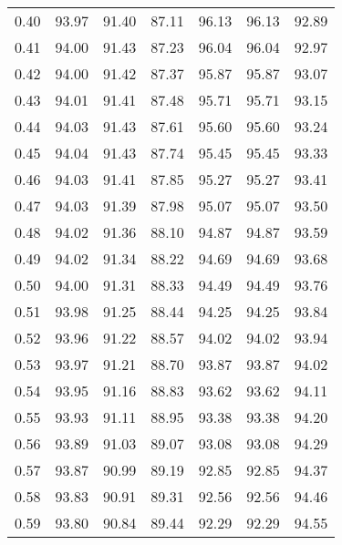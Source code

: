 \begin{tabular}{|c|c|c|c|c|c|c|}
      0.40 &     93.97 &     91.40 &      87.11 &   96.13 &      96.13 &         92.89 \\
      0.41 &     94.00 &     91.43 &      87.23 &   96.04 &      96.04 &         92.97 \\
      0.42 &     94.00 &     91.42 &      87.37 &   95.87 &      95.87 &         93.07 \\
      0.43 &     94.01 &     91.41 &      87.48 &   95.71 &      95.71 &         93.15 \\
      0.44 &     94.03 &     91.43 &      87.61 &   95.60 &      95.60 &         93.24 \\
      0.45 &     94.04 &     91.43 &      87.74 &   95.45 &      95.45 &         93.33 \\
      0.46 &     94.03 &     91.41 &      87.85 &   95.27 &      95.27 &         93.41 \\
      0.47 &     94.03 &     91.39 &      87.98 &   95.07 &      95.07 &         93.50 \\
      0.48 &     94.02 &     91.36 &      88.10 &   94.87 &      94.87 &         93.59 \\
      0.49 &     94.02 &     91.34 &      88.22 &   94.69 &      94.69 &         93.68 \\
      0.50 &     94.00 &     91.31 &      88.33 &   94.49 &      94.49 &         93.76 \\
      0.51 &     93.98 &     91.25 &      88.44 &   94.25 &      94.25 &         93.84 \\
      0.52 &     93.96 &     91.22 &      88.57 &   94.02 &      94.02 &         93.94 \\
      0.53 &     93.97 &     91.21 &      88.70 &   93.87 &      93.87 &         94.02 \\
      0.54 &     93.95 &     91.16 &      88.83 &   93.62 &      93.62 &         94.11 \\
      0.55 &     93.93 &     91.11 &      88.95 &   93.38 &      93.38 &         94.20 \\
      0.56 &     93.89 &     91.03 &      89.07 &   93.08 &      93.08 &         94.29 \\
      0.57 &     93.87 &     90.99 &      89.19 &   92.85 &      92.85 &         94.37 \\
      0.58 &     93.83 &     90.91 &      89.31 &   92.56 &      92.56 &         94.46 \\
      0.59 &     93.80 &     90.84 &      89.44 &   92.29 &      92.29 &         94.55 \\

\end{tabular}
